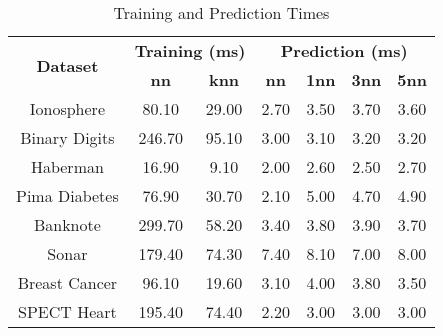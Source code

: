 \begin{table}[htbp]
\caption{Training and Prediction Times}
\begin{center}
\begin{tabular}{|c|c|c|c|c|c|c|}
\hline
\multirow{2}{*}{\textbf{Dataset}} & \multicolumn{2}{c|}{\textbf{Training (ms)}} & \multicolumn{4}{c|}{\textbf{Prediction (ms)}} \\ \cline{2-7}
 & \textbf{nn} & \textbf{knn} & \textbf{nn} & \textbf{1nn} & \textbf{3nn} & \textbf{5nn} \\ \hline
Ionosphere & 80.10 & 29.00 & 2.70 & 3.50 & 3.70 & 3.60 \\ \hline
Binary Digits & 246.70 & 95.10 & 3.00 & 3.10 & 3.20 & 3.20 \\ \hline
Haberman & 16.90 & 9.10 & 2.00 & 2.60 & 2.50 & 2.70 \\ \hline
Pima Diabetes & 76.90 & 30.70 & 2.10 & 5.00 & 4.70 & 4.90 \\ \hline
Banknote & 299.70 & 58.20 & 3.40 & 3.80 & 3.90 & 3.70 \\ \hline
Sonar & 179.40 & 74.30 & 7.40 & 8.10 & 7.00 & 8.00 \\ \hline
Breast Cancer & 96.10 & 19.60 & 3.10 & 4.00 & 3.80 & 3.50 \\ \hline
SPECT Heart & 195.40 & 74.40 & 2.20 & 3.00 & 3.00 & 3.00 \\ \hline
\end{tabular}
\label{tab:timing}
\end{center}
\end{table}